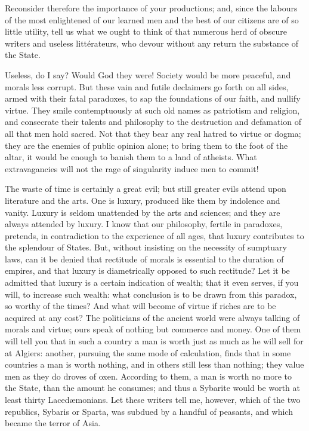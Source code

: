 Reconsider therefore the importance of your productions; and, since
the labours of the most enlightened of our learned men and the best of
our citizens are of so little utility, tell us what we ought to think
of that numerous herd of obscure writers and useless litt\'erateurs, who
devour without any return the substance of the State.

Useless, do I say? Would God they were! Society would be more
peaceful, and morals less corrupt. But these vain and futile
declaimers go forth on all sides, armed with their fatal paradoxes, to
sap the foundations of our faith, and nullify virtue. They smile
contemptuously at such old names as patriotism and religion, and
consecrate their talents and philosophy to the destruction and
defamation of all that men hold sacred. Not that they bear any real
hatred to virtue or dogma; they are the enemies of public opinion
alone; to bring them to the foot of the altar, it would be enough to
banish them to a land of atheists. What extravagancies will not the
rage of singularity induce men to commit!

The waste of time is certainly a great evil; but still greater evils
attend upon literature and the arts. One is luxury, produced like them
by indolence and vanity. Luxury is seldom unattended by the arts and
sciences; and they are always attended by luxury. I know that our
philosophy, fertile in paradoxes, pretends, in contradiction to the
experience of all ages, that luxury contributes to the splendour of
States. But, without insisting on the necessity of sumptuary laws, can
it be denied that rectitude of morals is essential to the duration of
empires, and that luxury is diametrically opposed to such rectitude?
 Let it be admitted that luxury is a certain indication of
wealth; that it even serves, if you will, to increase such wealth:
what conclusion is to be drawn from this paradox, so worthy of the
times? And what will become of virtue if riches are to be acquired at
any cost? The politicians of the ancient world were always talking of
morals and virtue; ours speak of nothing but commerce and money. One
of them will tell you that in such a country a man is worth just as
much as he will sell for at Algiers: another, pursuing the same mode
of calculation, finds that in some countries a man is worth nothing,
and in others still less than nothing; they value men as they do
droves of oxen. According to them, a man is worth no more to the
State, than the amount he consumes; and thus a Sybarite would be worth
at least thirty Laced\ae monians. Let these writers tell me, however,
which of the two republics, Sybaris or Sparta, was subdued by a
handful of peasants, and which became the terror of Asia.

